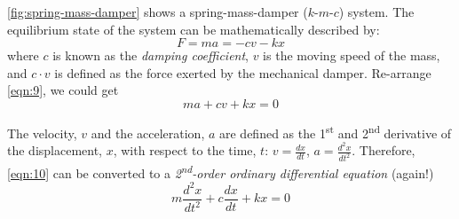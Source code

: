 \documentclass[12pt,a4paper]{article}
\begin{document}
\autoref{fig:spring-mass-damper} shows a spring-mass-damper ($k$-$m$-$c$) system. The equilibrium state of the system can be mathematically described by:
\begin{equation} \label{eqn:9}
    F = ma = -cv -kx 
\end{equation}
where $c$ is known as the \textit{damping coefficient}, $v$ is the moving speed of the mass, and $c \cdot v$ is defined as the force exerted by the mechanical damper. Re-arrange \autoref{eqn:9}, we could get
\begin{equation} \label{eqn:10}
    ma + cv + kx = 0
\end{equation}

The velocity, $v$ and the acceleration, $a$ are defined as the 1\textsuperscript{st} and 2\textsuperscript{nd} derivative of the displacement, $x$, with respect to the time, $t$:  $\displaystyle v=\frac{dx}{dt}$, $\displaystyle a=\frac{d^{2}x}{dt^{2}}$. Therefore, \autoref{eqn:10} can be converted to a \textit{2\textsuperscript{nd}-order ordinary differential equation} (again!)
\begin{equation} \label{eqn:11}
    m\frac{d^{2}x}{dt^{2}} + c\frac{dx}{dt} + kx = 0
\end{equation}
\end{document}
